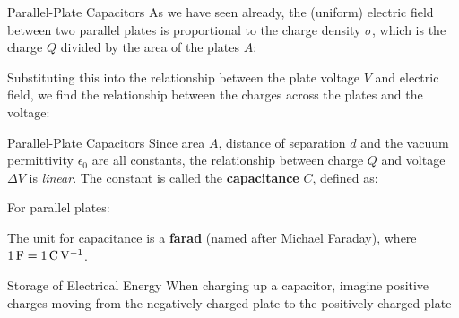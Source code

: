 \documentclass[12pt,aspectratio=169]{beamer}
\begin{document}
\begin{frame}{Parallel-Plate Capacitors}
  As we have seen already, the (uniform) electric field between two parallel
  plates is proportional to the charge density $\sigma$, which is the charge
  $Q$ divided by the area of the plates $A$:

  
  Substituting this into the relationship between the plate voltage $V$ and
  electric field, we find the relationship between the charges across the
  plates and the voltage:

\end{frame}



\begin{frame}{Parallel-Plate Capacitors}
  Since area $A$, distance of separation $d$ and the vacuum permittivity
  $\epsilon_0$ are all constants, the relationship between charge $Q$ and
  voltage $\Delta V$ is \emph{linear}. The constant is called the
  \textbf{capacitance} $C$, defined as:


  For parallel plates:


  The unit for capacitance is a \textbf{farad} (named after Michael Faraday),
  where $\SI1\farad=\SI1{\coulomb\per\volt}$.
\end{frame}



\begin{frame}{Storage of Electrical Energy}
  When charging up a capacitor, imagine positive charges moving from the
  negatively charged plate to the positively charged plate
  \begin{center}
  \end{center}
\end{frame}
\end{document}
